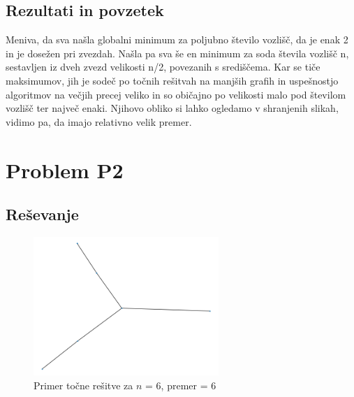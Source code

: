 \documentclass[a4paper, 12 pt]{article}
\begin{document}
\subsection{Rezultati in povzetek}

Meniva, da sva našla globalni minimum za poljubno število vozlišč, da je enak 2 in je dosežen pri zvezdah. Našla pa sva še en minimum za soda števila vozlišč n, sestavljen iz dveh zvezd velikosti n/2, povezanih s središčema. Kar se tiče maksimumov, jih je sodeč po točnih rešitvah na manjših grafih in uspešnostjo algoritmov na večjih precej veliko in so običajno po velikosti malo pod številom vozlišč ter največ enaki. Njihovo obliko si lahko ogledamo v shranjenih slikah, vidimo pa, da imajo relativno velik premer.

\pagebreak

\section{Problem P2}

\subsection{Reševanje}


\begin{figure}[H]
\centering
  \includegraphics[width=7cm]{drevo6diam4.png}
  \caption{Primer točne rešitve za $n$ = 6, premer = 6}
  \label{fig:graf1} 
\end{figure}
\end{document}

